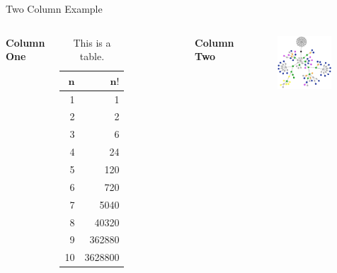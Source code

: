 \documentclass[10pt, xcolor={table}]{beamer}
\begin{document}
\begin{frame}{Two Column Example}
    \begin{columns}[]
    \column{5cm}
        \begin{center}
        \textbf{Column One} 
        \end{center}
        \begin{table}[h]
        \begin{tabular}{|r|r|}
        \hline
        \rowcolor{beaver!90}
        \color{white} $\mathbf{n}$&\color{white} $\mathbf{n!}$\\\hline \hline
        1&1\\
        2&2\\
        3&6\\
        4&24\\
        5&120\\
        6&720\\
        7&5040\\
        8&40320\\
        9&362880\\
        10&3628800\\
        \hline
        \end{tabular}
        \caption{This is a table.}
        \end{table}
        \vfill
    \column{5cm}
        \begin{center}
        \textbf{Column Two} \\\bigskip
        \end{center}
        \begin{center}
        \begin{figure}
        	\includegraphics[width=0.95\textwidth]{img/graphic}

\end{figure}
\end{center}
\end{columns}
\end{frame}
\end{document}
